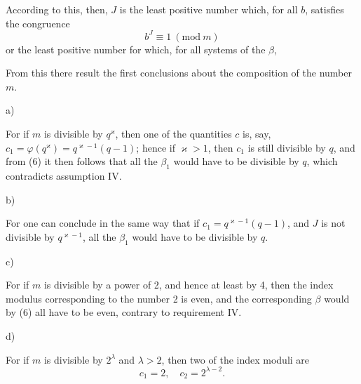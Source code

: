 
According to this, then, $J$ is the least positive number which, for all $b$, satisfies the congruence
\[
b^J\equiv 1\ (\mathrm{mod}\ m)
\]
or the least positive number for which, for all systems of the $\beta$,

From this there result the first conclusions about the composition of the number $m$.

a) 

For if $m$ is divisible by $q^\varkappa$, then one of the quantities $c$ is, say, $c_1=\varphi(q^\varkappa)=q^{\varkappa-1}(q-1)$; hence if $\varkappa>1$, then $c_1$ is still divisible by $q$, and from (6) it then follows that all the $\beta_1$ would have to be divisible by $q$, which contradicts assumption IV.

b) 

For one can conclude in the same way that if $c_1=q^{\varkappa-1}(q-1)$, and $J$ is not divisible by $q^{\varkappa-1}$, all the $\beta_1$ would have to be divisible by $q$.

c) 

For if $m$ is divisible by a power of 2, and hence at least by 4, then the index modulus corresponding to the number 2 is even, and the corresponding $\beta$ would by (6) all have to be even, contrary to requirement IV.

d) 

For if $m$ is divisible by $2^\lambda$ and $\lambda>2$, then two of the index moduli are
\[
c_1=2,\quad c_2=2^{\lambda-2}.
\]
